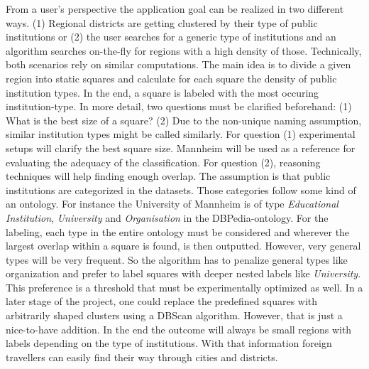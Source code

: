 From a user's perspective the application goal can be realized in two different ways. (1) Regional districts are getting clustered by their type of public institutions or (2) the user searches for a generic type of institutions and an algorithm searches on-the-fly for regions with a high density of those. Technically, both scenarios rely on similar computations. The main idea is to divide a given region into static squares and calculate for each square the density of public institution types. In the end, a square is labeled with the most occuring institution-type. In more detail, two questions must be clarified beforehand: (1) What is the best size of a square? (2) Due to the non-unique naming assumption, similar institution types might be called similarly. For question (1) experimental setups will clarify the best square size. Mannheim will be used as a reference for evaluating the adequacy of the classification. For question (2), reasoning techniques will help finding enough overlap. The assumption is that public institutions are categorized in the datasets. Those categories follow some kind of an ontology. For instance the University of Mannheim is of type \textit{Educational Institution}, \textit{University} and \textit{Organisation} in the DBPedia-ontology. For the labeling, each type in the entire ontology must be considered and wherever the largest overlap within a square is found, is then outputted. However, very general types will be very frequent. So the algorithm has to penalize general types like organization and prefer to label squares with deeper nested labels like \textit{University}. This preference is a threshold that must be experimentally optimized as well. In a later stage of the project, one could replace the predefined squares with arbitrarily shaped clusters using a DBScan algorithm. However, that is just a nice-to-have addition. In the end the outcome will always be small regions with labels depending on the type of institutions. With that information foreign travellers can easily find their way through cities and districts. 

